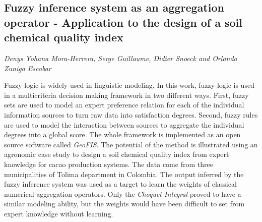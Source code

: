 \documentclass[../booklet.tex]{subfiles}
\begin{document}
\subsection[Fuzzy inference system as an aggregation operator -    Application to the design of a soil chemical quality index. {\it Denys Yohana Mora-Herrera, Serge Guillaume, Didier Snoeck and Orlando Zuniga Escobar}]{Fuzzy inference system as an aggregation operator -    Application to the design of a soil chemical quality index}
   

\begin{center}
  {\it Denys Yohana Mora-Herrera, Serge Guillaume, Didier Snoeck and Orlando Zuniga Escobar}
\end{center}



  Fuzzy logic is widely used in linguistic modeling. In this work, fuzzy logic is used in a multicriteria decision making framework in two different ways. First, fuzzy sets are used to model an expert preference relation for each of the individual information sources to turn raw data into satisfaction degrees. Second, fuzzy rules are used to model the interaction between sources to aggregate the individual degrees into a global score. The whole framework is implemented as an open source software called \textit{GeoFIS}. The potential of the method is illustrated using an agronomic case study to design a soil chemical quality index from expert knowledge for cacao production systems. The data come from three municipalities of Tolima department in Colombia. The output inferred by the fuzzy inference system was used as a target to learn the weights of classical numerical aggregation operators. Only the \textit{Choquet Integral} proved to have a similar modeling ability, but the weights would have been difficult to set from expert knowledge without learning.
  
\end{document}
